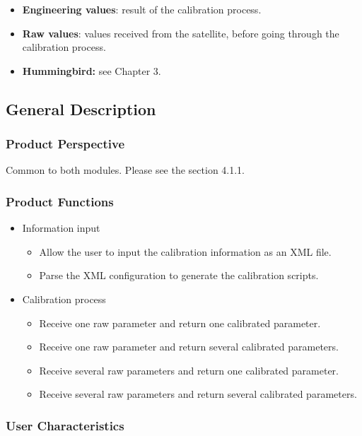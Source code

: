 \begin{itemize}
\item \textbf{Engineering values}: result of the calibration process.
\item \textbf{Raw values}: values received from the satellite, before going through the calibration process.
\item \textbf{Hummingbird:} see Chapter 3.
\end{itemize}

\subsection{General Description}
\subsubsection{Product Perspective}

Common to both modules. Please see the section 4.1.1.

\subsubsection{Product Functions}

\begin{itemize}
\item Information input
\begin{itemize}
\item Allow the user to input the calibration information as an XML file.
\item Parse the XML configuration to generate the calibration scripts.
\end{itemize}
\item Calibration process
\begin{itemize}
\item Receive one raw parameter and return one calibrated parameter.
\item Receive one raw parameter and return several calibrated parameters.
\item Receive several raw parameters and return one calibrated parameter.
\item Receive several raw parameters and return several calibrated parameters.
\end{itemize}

\end{itemize}

\subsubsection{User Characteristics}

